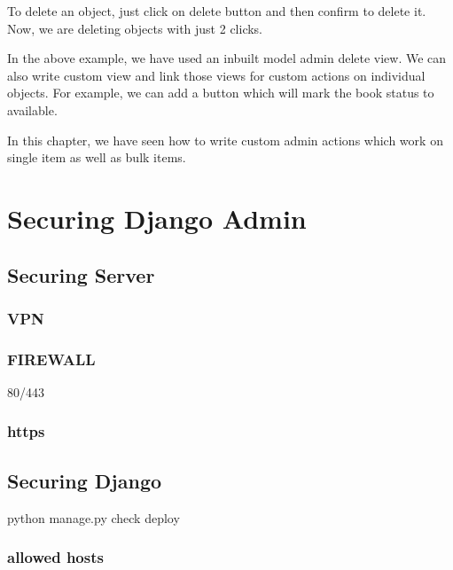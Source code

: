 \documentclass[letterpaper,12pt,english]{sphinxmanual}
\begin{document}
To delete an object, just click on delete button and then confirm to delete it. Now, we are deleting objects with just 2 clicks.

In the above example, we have used an inbuilt model admin delete view. We can also write custom view and link those views for custom actions on individual objects. For example, we can add a button which will mark the book status to available.

In this chapter, we have seen how to write custom admin actions which work on single item as well as bulk items.


\chapter{Securing Django Admin}
\label{\detokenize{admin_secure:securing-django-admin}}\label{\detokenize{admin_secure::doc}}

\section{Securing Server}
\label{\detokenize{admin_secure:securing-server}}

\subsection{VPN}
\label{\detokenize{admin_secure:vpn}}

\subsection{FIREWALL}
\label{\detokenize{admin_secure:firewall}}
80/443


\subsection{https}
\label{\detokenize{admin_secure:https}}

\section{Securing Django}
\label{\detokenize{admin_secure:securing-django}}
python manage.py check \textendash{}deploy


\subsection{allowed hosts}
\label{\detokenize{admin_secure:allowed-hosts}}
\end{document}
